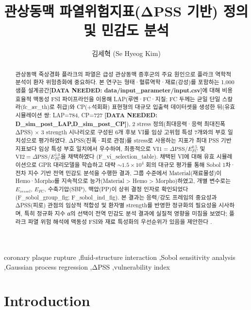 \documentclass[preprint,12pt]{elsarticle}
\begin{document}
\begin{frontmatter}
\title{관상동맥 파열위험지표(ΔPSS 기반) 정의 및 민감도 분석}
\author[label1]{김세혁 (Se Hyeog Kim)}
\begin{abstract}
관상동맥 죽상경화 플라크의 파열은 급성 관상동맥 증후군의 주요 원인으로 플라크 역학적 분석이 환자 위험층화에 중요하다. 본 연구는 형태·혈류역학·재료(강성)를 포함하는 1,000 샘플 설계공간\textbf{[DATA NEEDED: data/input\_parameter/input.csv]}에 대해 비용효율적 맥동성 FSI 파이프라인을 이용해 LAP(루멘·FC·지질; FC 두께는 균일 단일 스칼라(fc\_av\_th)로 취급)와 CP(+석회화) 표현형의 대규모 입출력 데이터셋을 생성한 뒤(유효 시뮬레이션 쌍: LAP=784, CP=727 \textbf{[DATA NEEDED: D\_sim\_post\_LAP,D\_sim\_post\_CP]}), 2 stress 정의(최대응력·응력 최대진폭 ΔPSS) × 3 strength 시나리오로 구성된 6개 후보 VI를 임상 고위험 특성 7개와의 부호 일치성으로 평가하였다. ΔPSS(진폭·피로 관점)를 stress로 사용하는 지표가 최대 PSS 기반 지표보다 임상 특성 부호 일치에서 우수하여, 최종적으로 $ \mathrm{VI1}=\Delta\mathrm{PSS}/E_{FC}^{0.5}$ 및 $ \mathrm{VI2}=\Delta\mathrm{PSS}/E_{FC}^{1.0}$을 채택하였다 (F\_vi\_selection\_table). 채택된 VI에 대해 유효 시뮬레이션으로 GPR 대리모델을 학습하고 대략 $\sim1.5\times10^{4}$ 회의 대규모 평가를 통해 Sobol 1차·전차 지수 기반 전역 민감도 분석을 수행한 결과, 그룹 수준에서 Material(재료물성)이 Hemo·Morpho를 지속적으로 능가(Material > Hemo > Morpho)하였고, 개별 변수로는 $E_{vessel}$, $E_{FC}$, 수축기압(SBP), 맥압(PP)이 상위 결정 인자로 확인되었다 (F\_sobol\_group\_fig; F\_sobol\_ind\_fig). 본 결과는 응력/강도 프레임의 중요성과 ΔPSS(피로) 관점의 임상적 적합성 및 환자별 strength를 반영한 정규화의 필요성을 시사하며, 특히 정규화 지수 α의 선택이 전역 민감도 분석 결과에 실질적 영향을 미침을 보였다; 플라크 파열 위험 해석에 맥동성 FSI와 재료 특성화의 우선순위가 있음을 제안한다 \cite{brown2016} \cite{choi2015} \cite{stefanadis2017} \cite{chaichana2012}.
\end{abstract}
\begin{keyword}
coronary plaque rupture \sep fluid-structure interaction \sep Sobol sensitivity analysis \sep Gaussian process regression \sep ΔPSS \sep vulnerability index
\end{keyword}
\end{frontmatter}

\section{Introduction}
\end{document}
